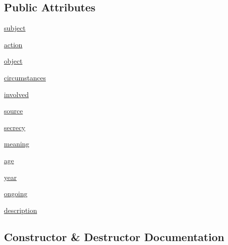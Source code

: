 \subsection*{Public Attributes}
\begin{DoxyCompactItemize}
\item 
\hyperlink{classclasses_1_1information_1_1Bit_ac829119e8cfe1937fe324d62a9dbad10}{subject}
\item 
\hyperlink{classclasses_1_1information_1_1Bit_ae2b2e2283b963c5b1265a43207b950e6}{action}
\item 
\hyperlink{classclasses_1_1information_1_1Bit_a21f13a1df6af7ffbfa228b05e7f8521c}{object}
\item 
\hyperlink{classclasses_1_1information_1_1Bit_a2fdecc773cf1b420653aebd6f0db3a99}{circumstances}
\item 
\hyperlink{classclasses_1_1information_1_1Bit_a8c72fb3b9fa8f156bca937e3dc413638}{involved}
\item 
\hyperlink{classclasses_1_1information_1_1Bit_abe5cb2715ae2fc08dcb74e78e9c55a8c}{source}
\item 
\hyperlink{classclasses_1_1information_1_1Bit_a24bd281f7d6310cfbc4f0157cbaa9b9f}{secrecy}
\item 
\hyperlink{classclasses_1_1information_1_1Bit_af08a96c180c62f7e99d9ff2d2a5c4afb}{meaning}
\item 
\hyperlink{classclasses_1_1information_1_1Bit_ae8321d5f425e99aef73581a796398bfb}{age}
\item 
\hyperlink{classclasses_1_1information_1_1Bit_a92eab83638def3a8c5f5fa31cd479968}{year}
\item 
\hyperlink{classclasses_1_1information_1_1Bit_a2be60978e576c8f399e5322a1c46b25d}{ongoing}
\item 
\hyperlink{classclasses_1_1information_1_1Bit_a9845a4a2f2ecfcf3f5782273689bc0ba}{description}
\end{DoxyCompactItemize}


\subsection{Constructor \& Destructor Documentation}
\mbox{\label{classclasses_1_1information_1_1Bit_aa267109ed898fef3aae20caecf2e4c60}} 
